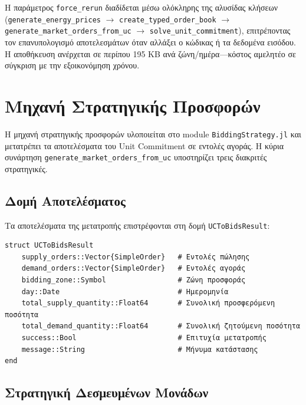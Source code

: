 Η παράμετρος \texttt{force\_rerun} διαδίδεται μέσω ολόκληρης της αλυσίδας κλήσεων (\texttt{generate\_energy\_prices} $\to$ \texttt{create\_typed\_order\_book} $\to$ \texttt{generate\_market\_orders\_from\_uc} $\to$ \texttt{solve\_unit\_commitment}), επιτρέποντας τον επανυπολογισμό αποτελεσμάτων όταν αλλάξει ο κώδικας ή τα δεδομένα εισόδου. Η αποθήκευση ανέρχεται σε περίπου 195 KB ανά ζώνη/ημέρα---κόστος αμελητέο σε σύγκριση με την εξοικονόμηση χρόνου.


\section{Μηχανή Στρατηγικής Προσφορών}
\label{sec:bidding-strategy-engine}

Η μηχανή στρατηγικής προσφορών υλοποιείται στο module \texttt{BiddingStrategy.jl} και μετατρέπει τα αποτελέσματα του Unit Commitment σε εντολές αγοράς. Η κύρια συνάρτηση \texttt{generate\_market\_orders\_from\_uc} υποστηρίζει τρεις διακριτές στρατηγικές.

\subsection{Δομή Αποτελέσματος}
\label{subsec:bidding-result}

Τα αποτελέσματα της μετατροπής επιστρέφονται στη δομή \texttt{UCToBidsResult}:

\begin{samepage}
\begin{verbatim}
struct UCToBidsResult
    supply_orders::Vector{SimpleOrder}   # Εντολές πώλησης
    demand_orders::Vector{SimpleOrder}   # Εντολές αγοράς
    bidding_zone::Symbol                 # Ζώνη προσφοράς
    day::Date                            # Ημερομηνία
    total_supply_quantity::Float64       # Συνολική προσφερόμενη ποσότητα
    total_demand_quantity::Float64       # Συνολική ζητούμενη ποσότητα
    success::Bool                        # Επιτυχία μετατροπής
    message::String                      # Μήνυμα κατάστασης
end
\end{verbatim}
\end{samepage}

\subsection{Στρατηγική Δεσμευμένων Μονάδων}
\label{subsec:committed-only-strategy}

